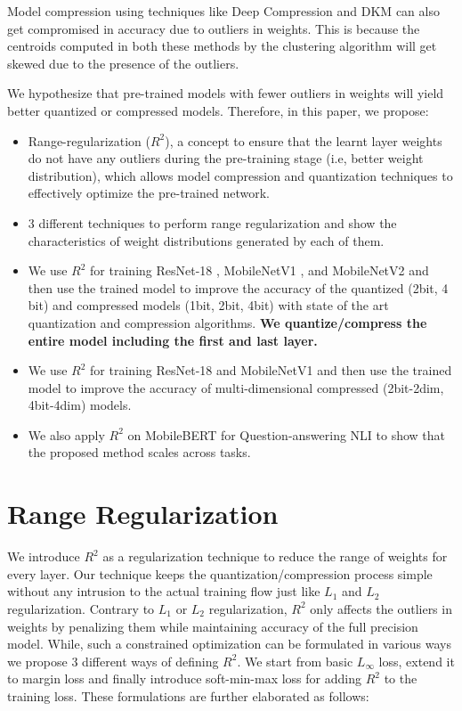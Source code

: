 \documentclass[10pt,twocolumn,letterpaper]{article}
\begin{document}
Model compression using techniques like Deep Compression \cite{HanMD15} and DKM \cite{cho2021dkm} can also get compromised in accuracy due to outliers in weights. This is because the centroids computed in both these methods by the clustering algorithm will get skewed due to the presence of the outliers. 

We hypothesize that pre-trained models with fewer outliers in weights will yield better quantized or compressed models. Therefore, in this paper, we propose:
\begin{itemize}
\item
{Range-regularization ($R^2$), a concept to ensure that the learnt layer weights do not have any outliers during the pre-training stage (i.e, better weight distribution), which allows model compression and quantization techniques to effectively optimize the pre-trained network.}
\item
{3 different techniques to perform range regularization and show the characteristics of weight distributions generated by each of them}.
\item
{We use $R^2$ for training ResNet-18 \cite{he2016deep}, MobileNetV1 \cite{howard2017mobilenets}, and MobileNetV2 \cite{sandler2018mobilenetv2} and then use the trained model to improve the accuracy of the quantized (2bit, 4 bit) and compressed models (1bit, 2bit, 4bit) with state of the art quantization and compression algorithms. \textbf{We quantize/compress the entire model including the first and last layer.}}
\item
{We use $R^2$ for training ResNet-18 and MobileNetV1 and then use the trained model to improve the accuracy of multi-dimensional compressed (2bit-2dim, 4bit-4dim) models.}
\item
{We also apply $R^2$ on MobileBERT \cite{sun2020mobilebert} for Question-answering NLI \cite{rajpurkar2016squad} to show that the proposed method scales across tasks.}
\end{itemize}






 \section{Range Regularization}
We introduce $R^2$ as a regularization technique to reduce the range of weights for every layer. Our technique keeps the quantization/compression process simple without any intrusion to the actual training flow just like $L_1$ and $L_2$ regularization. Contrary to $L_1$ or $L_2$ regularization, $R^2$ only affects the outliers in weights by penalizing them while maintaining accuracy of the full precision model. While, such a constrained optimization can be formulated in various ways we propose 3 different ways of defining $R^2$. We start from basic $L_\infty$ loss, extend it to margin loss and finally introduce soft-min-max loss for adding $R^2$ to the training loss. These formulations are further elaborated as follows:
\end{document}
